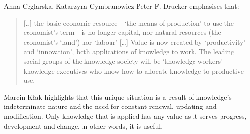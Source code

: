 \begin{artengenv2auth}{Anna Ceglarska, Katarzyna Cymbranowicz}
Peter F. Drucker 
\parencite*[][p.7]{drucker_post-capitalist_2013} %
 emphasises that:
\begin{quote}
 […] the basic economic resource---‘the means of production' to use the economist's term---is no longer capital, nor natural resources (the economist's ‘land') nor ‘labour' […] Value is now created by `productivity' and `innovation', both applications of knowledge to work. The leading social groups of the knowledge society will be ‘knowledge workers'---knowledge executives who know how to allocate knowledge to productive use.
\end{quote}
 Marcin Kłak 
\parencite*[][p.42]{klak_zarzadzanie_2010} %
 highlights that this unique situation is a~result of knowledge's indeterminate nature and the need for constant renewal, updating and modification. Only knowledge that is applied has any value as it serves progress, development and change, in other words, it is useful.




\end{artengenv2auth}
